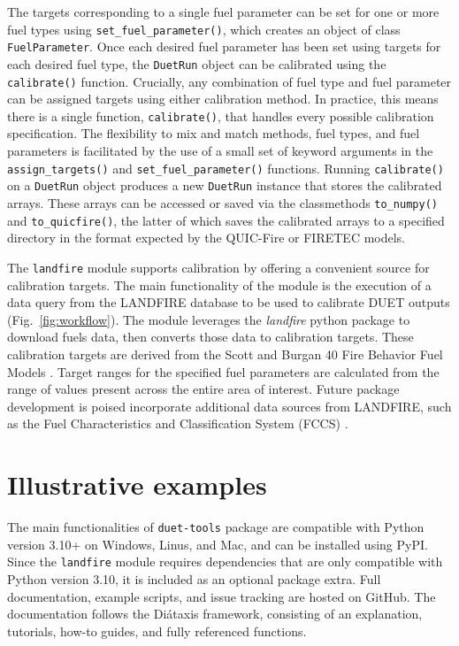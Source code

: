 \documentclass[preprint,12pt,a4paper]{elsarticle}
\begin{document}
The targets corresponding to a single fuel parameter can be set for one or more fuel types using \texttt{set\_fuel\_parameter()}, which creates an object of class \texttt{FuelParameter}.
Once each desired fuel parameter has been set using targets for each desired fuel type, the \texttt{DuetRun} object can be calibrated using the \texttt{calibrate()} function.
Crucially, any combination of fuel type and fuel parameter can be assigned targets using either calibration method.
In practice, this means there is a single function, \texttt{calibrate()}, that handles every possible calibration specification.
The flexibility to mix and match methods, fuel types, and fuel parameters is facilitated by the use of a small set of keyword arguments in the \texttt{assign\_targets()} and \texttt{set\_fuel\_parameter()} functions.
Running \texttt{calibrate()} on a \texttt{DuetRun} object produces a new \texttt{DuetRun} instance that stores the calibrated arrays.
These arrays can be accessed or saved via the classmethods \texttt{to\_numpy()} and \texttt{to\_quicfire()}, the latter of which saves the calibrated arrays to a specified directory in the format expected by the QUIC-Fire or FIRETEC models.\newline

The \texttt{landfire} module supports calibration by offering a convenient source for calibration targets.
The main functionality of the module is the execution of a data query from the LANDFIRE database \cite{la_puma_landfire_2023} to be used to calibrate DUET outputs (Fig.~\ref{fig:workflow}).
The module leverages the \textit{landfire} python package \cite{landfire_python_2023} to download fuels data, then converts those data to calibration targets.
These calibration targets are derived from the Scott and Burgan 40 Fire Behavior Fuel Models \cite{scott_standard_2005}.
Target ranges for the specified fuel parameters are calculated from the range of values present across the entire area of interest.
Future package development is poised incorporate additional data sources from LANDFIRE, such as the Fuel Characteristics and Classification System (FCCS) \cite{ottmar_overview_2007}.

\section{Illustrative examples}

The main functionalities of \texttt{duet-tools} package are compatible with Python version 3.10+ on Windows, Linus, and Mac, and can be installed using PyPI.
Since the \texttt{landfire} module requires dependencies that are only compatible with Python version 3.10, it is included as an optional package extra.
Full documentation, example scripts, and issue tracking are hosted on GitHub.
The documentation follows the Diátaxis framework, consisting of an explanation, tutorials, how-to guides, and fully referenced functions.
\end{document}
